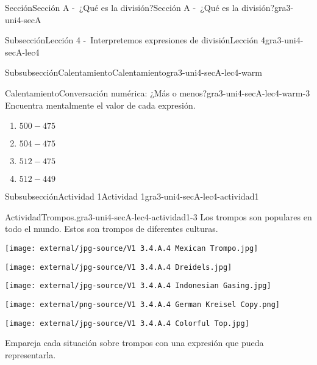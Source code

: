 \documentclass[twoside,14pt,]{extarticle}
\begin{document}
\begin{sectionptx}{Sección}{Sección A -~¿Qué es la división?}{}{Sección A -~¿Qué es la división?}{}{}{gra3-uni4-secA}
\begin{subsectionptx}{Subsección}{Lección 4 -~Interpretemos expresiones de división}{}{Lección 4}{}{}{gra3-uni4-secA-lec4}
\begin{subsubsectionptx}{Subsubsección}{Calentamiento}{}{Calentamiento}{}{}{gra3-uni4-secA-lec4-warm}
\begin{exploration}{Calentamiento}{Conversación numérica: ¿Más o menos?}{gra3-uni4-secA-lec4-warm-3}
Encuentra mentalmente el valor de cada expresión.%
\par
%
\begin{enumerate}
\item{}\(\displaystyle 500 - 475\)%
\item{}\(\displaystyle 504 - 475\)%
\item{}\(\displaystyle 512 - 475\)%
\item{}\(\displaystyle 512 - 449\)%
\end{enumerate}
%
\end{exploration}%
\end{subsubsectionptx}
%
%
\typeout{************************************************}
\typeout{************************************************}
%
\begin{subsubsectionptx}{Subsubsección}{Actividad 1}{}{Actividad 1}{}{}{gra3-uni4-secA-lec4-actividad1}
\begin{activity}{Actividad}{Trompos.}{gra3-uni4-secA-lec4-actividad1-3}%
Los trompos son populares en todo el mundo. Estos son trompos de diferentes culturas.%
\begin{sidebyside}{5}{0}{0}{0}%
\begin{sbspanel}{0.2}%
\texttt{[image: external/jpg-source/V1 3.4.A.4 Mexican Trompo.jpg]}
\end{sbspanel}%
\begin{sbspanel}{0.2}%
\texttt{[image: external/jpg-source/V1 3.4.A.4 Dreidels.jpg]}
\end{sbspanel}%
\begin{sbspanel}{0.2}%
\texttt{[image: external/jpg-source/V1 3.4.A.4 Indonesian Gasing.jpg]}
\end{sbspanel}%
\begin{sbspanel}{0.2}%
\texttt{[image: external/png-source/V1 3.4.A.4 German Kreisel Copy.png]}
\end{sbspanel}%
\begin{sbspanel}{0.2}%
\texttt{[image: external/jpg-source/V1 3.4.A.4 Colorful Top.jpg]}
\end{sbspanel}%
\end{sidebyside}%
\par
Empareja cada situación sobre trompos con una expresión que pueda representarla.%
\pagebreak
\begin{sidebyside}{2}{0.05}{0}{0.15}%

\end{sidebyside}
\end{activity}
\end{subsubsectionptx}
\end{subsectionptx}
\end{sectionptx}
\end{document}
